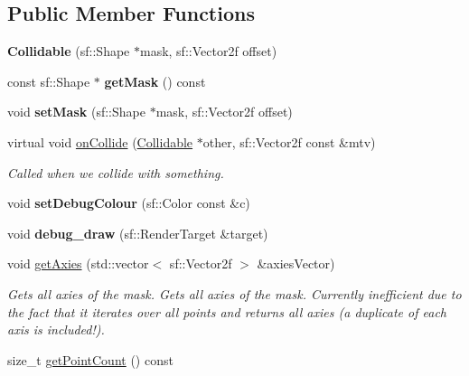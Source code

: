 \subsection*{Public Member Functions}
\begin{DoxyCompactItemize}
\item 
\hypertarget{classcollision_1_1_collidable_aab9ad50a52775297bb3d373f14ba15df}{}{\bfseries Collidable} (sf\+::\+Shape $\ast$mask, sf\+::\+Vector2f offset)\label{classcollision_1_1_collidable_aab9ad50a52775297bb3d373f14ba15df}

\item 
\hypertarget{classcollision_1_1_collidable_a38bac56d0e39176287f159805c3ef93f}{}const sf\+::\+Shape $\ast$ {\bfseries get\+Mask} () const \label{classcollision_1_1_collidable_a38bac56d0e39176287f159805c3ef93f}

\item 
\hypertarget{classcollision_1_1_collidable_a59968e2602832ae42750148e1d9a574a}{}void {\bfseries set\+Mask} (sf\+::\+Shape $\ast$mask, sf\+::\+Vector2f offset)\label{classcollision_1_1_collidable_a59968e2602832ae42750148e1d9a574a}

\item 
\hypertarget{classcollision_1_1_collidable_a1f88bef85869630909cce6d040a6f53a}{}virtual void \hyperlink{classcollision_1_1_collidable_a1f88bef85869630909cce6d040a6f53a}{on\+Collide} (\hyperlink{classcollision_1_1_collidable}{Collidable} $\ast$other, sf\+::\+Vector2f const \&mtv)\label{classcollision_1_1_collidable_a1f88bef85869630909cce6d040a6f53a}

\begin{DoxyCompactList}\small\item\em Called when we collide with something. \end{DoxyCompactList}\item 
\hypertarget{classcollision_1_1_collidable_aec61f1b090248e26b4ceaed2ea7ad885}{}void {\bfseries set\+Debug\+Colour} (sf\+::\+Color const \&c)\label{classcollision_1_1_collidable_aec61f1b090248e26b4ceaed2ea7ad885}

\item 
\hypertarget{classcollision_1_1_collidable_a3acb897afe5bedccab5c857f165e6355}{}void {\bfseries debug\+\_\+draw} (sf\+::\+Render\+Target \&target)\label{classcollision_1_1_collidable_a3acb897afe5bedccab5c857f165e6355}

\item 
void \hyperlink{classcollision_1_1_collidable_afca4351156e8e146db120e715c420c88}{get\+Axies} (std\+::vector$<$ sf\+::\+Vector2f $>$ \&axies\+Vector)
\begin{DoxyCompactList}\small\item\em Gets all axies of the mask. Gets all axies of the mask. Currently inefficient due to the fact that it iterates over all points and returns all axies (a duplicate of each axis is included!). \end{DoxyCompactList}\item 
\hypertarget{classcollision_1_1_collidable_a10c40bfb76a63c35f468fe0ec2eaf5bd}{}size\+\_\+t \hyperlink{classcollision_1_1_collidable_a10c40bfb76a63c35f468fe0ec2eaf5bd}{get\+Point\+Count} () const \label{classcollision_1_1_collidable_a10c40bfb76a63c35f468fe0ec2eaf5bd}


\end{DoxyCompactItemize}
